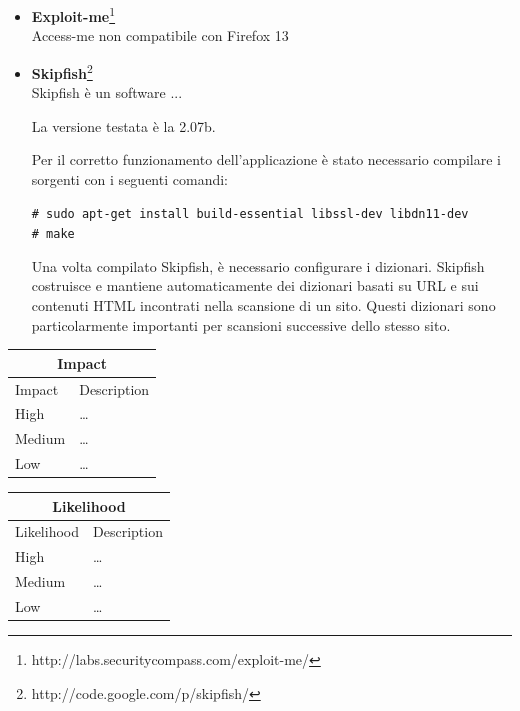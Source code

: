 \documentclass{article}
\begin{document}
\begin{itemize}
Sono state individuate in tutto 57 vulnerabilità.
Ognuna delle vulnerabilità segnala che, ad una richiesta particolare, il server ha risposto con un codice d'errore \emph{500}\footnote{Questo codice d'errore indica un errore generico avvenuto sul server a seguito di una richiesta impossibile da risolvere(Internal server error).}.

\item \textbf{Exploit-me}\footnote{http://labs.securitycompass.com/exploit-me/}\\
Access-me non compatibile con Firefox 13
\item \textbf{Skipfish}\footnote{http://code.google.com/p/skipfish/}\\
Skipfish è un software ...

La versione testata è la 2.07b.

Per il corretto funzionamento dell'applicazione è stato necessario compilare i sorgenti con i seguenti comandi:

\small
{\tt  \# sudo apt-get install build-essential libssl-dev libdn11-dev\\
\# make\\
}

Una volta compilato Skipfish, è necessario configurare i dizionari.
Skipfish costruisce e mantiene automaticamente dei dizionari basati su URL e sui contenuti HTML incontrati nella scansione di un sito.
Questi dizionari sono particolarmente importanti per scansioni successive dello stesso sito.


\end{itemize}

\begin{center}
\begin{tabular}{|l|l|}
\hline
\multicolumn{2}{|c|}{\bf Impact} \\
\hline
Impact & Description \\
\hline
\hline
High   & \hspace*{20pt}\ldots \\
\hline
Medium & \hspace*{20pt}\ldots \\
\hline
Low   & \hspace*{20pt}\ldots \\
\hline
\end{tabular}
%
\vspace{5mm}
%
\noindent \hspace*{10pt}
\begin{tabular}{|l|l|}
\hline
\multicolumn{2}{|c|}{\bf Likelihood} \\
\hline
Likelihood & Description \\
\hline
\hline
High   & \hspace*{20pt}\ldots \\
\hline
Medium & \hspace*{20pt}\ldots \\
\hline
Low   & \hspace*{20pt}\ldots \\
\hline
\end{tabular}
\end{center}
\end{document}
